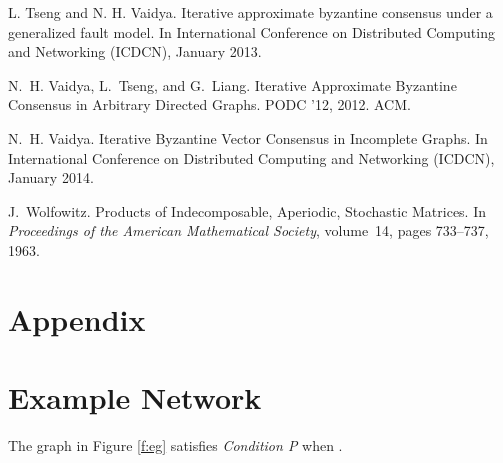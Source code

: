 \documentclass{llncs}
\begin{document}
\begin{thebibliography}{10}
L. Tseng and N. H. Vaidya. 
\newblock Iterative approximate byzantine consensus under a generalized fault model.
\newblock In International Conference on Distributed Computing and Networking (ICDCN), January 2013.

N.~H. Vaidya, L.~Tseng, and G.~Liang.
\newblock Iterative Approximate Byzantine Consensus in Arbitrary Directed
  Graphs.
\newblock PODC '12, 2012. ACM.

N.~H. Vaidya.
\newblock Iterative Byzantine Vector Consensus in Incomplete Graphs.
\newblock In International Conference on Distributed Computing and Networking (ICDCN), January 2014.


J.~Wolfowitz.
\newblock Products of Indecomposable, Aperiodic, Stochastic Matrices.
\newblock In {\em Proceedings of the American Mathematical Society}, volume~14,
  pages 733--737, 1963.
\end{thebibliography}



\appendix

\section*{Appendix}

\section{Example Network}
\label{a:example}


\begin{lemma}
The graph in Figure \ref{f:eg} satisfies {\em Condition P} when .
\end{lemma}
\end{document}
